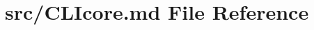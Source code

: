 \hypertarget{src_2CLIcore_8md}{\section{src/\+C\+L\+Icore.md File Reference}
\label{src_2CLIcore_8md}
}
